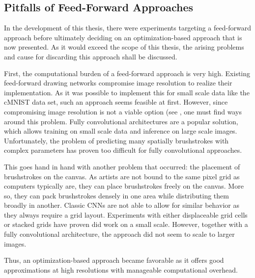 \subsection{Pitfalls of Feed-Forward Approaches}

In the development of this thesis, there were experiments targeting a feed-forward approach before ultimately deciding on an optimization-based approach that is now presented.
As it would exceed the scope of this thesis, the arising problems and cause for discarding this approach shall be discussed.

First, the computational burden of a feed-forward approach is very high.
Existing feed-forward drawing networks compromise image resolution to realize their implementation.
As it was possible to implement this for small scale data like the cMNIST data set, such an approach seems feasible at first.  
However, since compromising image resolution is not a viable option (see , one must find ways around this problem.
Fully convolutional architectures are a popular solution, which allows training on small scale data and inference on large scale images.
Unfortunately, the problem of predicting many spatially brushstrokes with complex parameters has proven too difficult for fully convolutional approaches.

This goes hand in hand with another problem that occurred: the placement of brushstrokes on the canvas.
As artists are not bound to the same pixel grid as computers typically are, they can place brushstrokes freely on the canvas.
More so, they can pack brushstrokes densely in one area while distributing them broadly in another.
Classic CNNs are not able to allow for similar behavior as they always require a grid layout.
Experiments with either displaceable grid cells or stacked grids have proven did work on a small scale.
However, together with a fully convolutional architecture, the approach did not seem to scale to larger images.

Thus, an optimization-based approach became favorable as it offers good approximations at high resolutions with manageable computational overhead.



